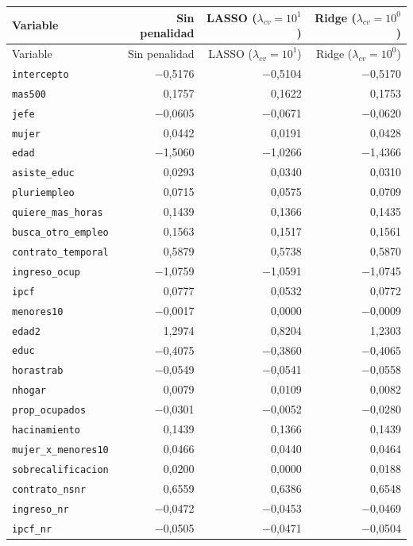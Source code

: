 \begin{longtable}{lrrr}
\toprule
Variable & Sin penalidad & LASSO ($\lambda_{cv} = 10^{1}$) & Ridge ($\lambda_{cv} = 10^{0}$) \\
\midrule
\endfirsthead
\toprule
Variable & Sin penalidad & LASSO ($\lambda_{cv} = 10^{1}$) & Ridge ($\lambda_{cv} = 10^{0}$) \\
\midrule
\endhead
\texttt{intercepto} & $-$0,5176 & $-$0,5104 & $-$0,5170 \\
\texttt{mas500} & 0,1757 & 0,1622 & 0,1753 \\
\texttt{jefe} & $-$0,0605 & $-$0,0671 & $-$0,0620 \\
\texttt{mujer} & 0,0442 & 0,0191 & 0,0428 \\
\texttt{edad} & $-$1,5060 & $-$1,0266 & $-$1,4366 \\
\texttt{asiste\_educ} & 0,0293 & 0,0340 & 0,0310 \\
\texttt{pluriempleo} & 0,0715 & 0,0575 & 0,0709 \\
\texttt{quiere\_mas\_horas} & 0,1439 & 0,1366 & 0,1435 \\
\texttt{busca\_otro\_empleo} & 0,1563 & 0,1517 & 0,1561 \\
\texttt{contrato\_temporal} & 0,5879 & 0,5738 & 0,5870 \\
\texttt{ingreso\_ocup} & $-$1,0759 & $-$1,0591 & $-$1,0745 \\
\texttt{ipcf} & 0,0777 & 0,0532 & 0,0772 \\
\texttt{menores10} & $-$0,0017 & 0,0000 & $-$0,0009 \\
\texttt{edad2} & 1,2974 & 0,8204 & 1,2303 \\
\texttt{educ} & $-$0,4075 & $-$0,3860 & $-$0,4065 \\
\texttt{horastrab} & $-$0,0549 & $-$0,0541 & $-$0,0558 \\
\texttt{nhogar} & 0,0079 & 0,0109 & 0,0082 \\
\texttt{prop\_ocupados} & $-$0,0301 & $-$0,0052 & $-$0,0280 \\
\texttt{hacinamiento} & 0,1439 & 0,1366 & 0,1439 \\
\texttt{mujer\_x\_menores10} & 0,0466 & 0,0440 & 0,0464 \\
\texttt{sobrecalificacion} & 0,0200 & 0,0000 & 0,0188 \\
\texttt{contrato\_nsnr} & 0,6559 & 0,6386 & 0,6548 \\
\texttt{ingreso\_nr} & $-$0,0472 & $-$0,0453 & $-$0,0469 \\
\texttt{ipcf\_nr} & $-$0,0505 & $-$0,0471 & $-$0,0504 \\

\end{longtable}
